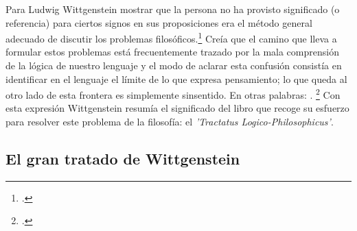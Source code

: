 
Para Ludwig Wittgenstein mostrar que la persona no ha provisto significado (o
referencia) para ciertos signos en sus proposiciones era el método general
adecuado de discutir los problemas filosóficos.\footcite[cf. p. 151]{IWT} Creía
que el camino que lleva a formular estos problemas está frecuentemente trazado
por la mala comprensión de la lógica de nuestro lenguaje y el modo de aclarar
esta confusión consistía en identificar en el lenguaje el límite de lo que
expresa pensamiento; lo que queda al otro lado de esta frontera es simplemente
sinsentido. En otras palabras: . 
\footcite[prefacio]{tractatus}
Con esta expresión  Wittgenstein resumía el significado del libro que recoge su
esfuerzo para resolver este problema de la filosofía: el \emph{'Tractatus
    Logico-Philosophicus'}. 

\subsection{El gran tratado de Wittgenstein}


